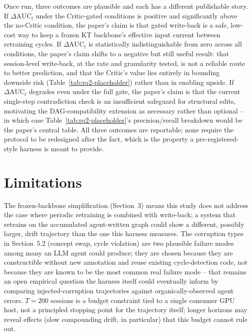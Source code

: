 \documentclass[review,12pt]{elsarticle}
\begin{document}
Once run, three outcomes are plausible and each has a different
publishable story. If $\Delta\text{AUC}_t$ under the Critic-gated
conditions is positive and significantly above the no-Critic condition,
the paper's claim is that gated write-back is a safe, low-cost way to
keep a frozen KT backbone's effective input current between retraining
cycles. If $\Delta\text{AUC}_t$ is statistically indistinguishable from
zero across all conditions, the paper's claim shifts to a negative but
still useful result: that session-level write-back, at the rate and
granularity tested, is not a reliable route to better prediction, and
that the Critic's value lies entirely in bounding downside risk
(Table~\ref{tab:rq2-placeholder}) rather than in enabling upside. If
$\Delta\text{AUC}_t$ degrades even under the full gate, the paper's claim
is that the current single-step contradiction check is an insufficient
safeguard for structural edits, motivating the DAG-compatibility
extension as necessary rather than optional -- in which case
Table~\ref{tab:rq2-placeholder}'s precision/recall breakdown would be the
paper's central table. All three outcomes are reportable; none require
the protocol to be redesigned after the fact, which is the property a
pre-registered-style harness is meant to provide.

\section{Limitations}

The frozen-backbone simplification (Section~3) means this study does not
address the case where periodic retraining is combined with write-back;
a system that retrains on the accumulated agent-written graph could show
a different, possibly larger, drift trajectory than the one this harness
measures. The corruption types in Section~5.2 (concept swap, cycle
violation) are two plausible failure modes among many an LLM agent could
produce; they are chosen because they are constructible without new
annotation and reuse existing cycle-detection code, not because they are
known to be the most common real failure mode -- that remains an open
empirical question the harness itself could eventually inform by
comparing injected-corruption trajectories against organically-observed
agent errors. $T=200$ sessions is a budget constraint tied to a single
consumer GPU host, not a principled stopping point for the trajectory
itself; longer horizons may reveal effects (slow compounding drift, in
particular) that this budget cannot rule out.
\end{document}
